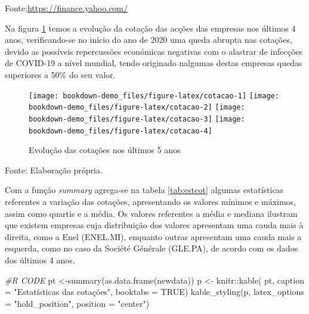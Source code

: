\documentclass[
  12pt,
  a4paper,
  openany]{book}
\newenvironment{Shaded}{\begin{snugshade}}{\end{snugshade}}
\newcommand{\AttributeTok}[1]{\textcolor[rgb]{0.77,0.63,0.00}{#1}}
\newcommand{\CommentTok}[1]{\textcolor[rgb]{0.56,0.35,0.01}{\textit{#1}}}
\newcommand{\ConstantTok}[1]{\textcolor[rgb]{0.00,0.00,0.00}{#1}}
\newcommand{\FunctionTok}[1]{\textcolor[rgb]{0.00,0.00,0.00}{#1}}
\newcommand{\NormalTok}[1]{#1}
\newcommand{\OtherTok}[1]{\textcolor[rgb]{0.56,0.35,0.01}{#1}}
\newcommand{\SpecialCharTok}[1]{\textcolor[rgb]{0.00,0.00,0.00}{#1}}
\newcommand{\StringTok}[1]{\textcolor[rgb]{0.31,0.60,0.02}{#1}}
\theoremstyle{definition}
\theoremstyle{definition}
\theoremstyle{definition}
\theoremstyle{remark}
\begin{document}
Fonte:\url{https://finance.yahoo.com/}

\justifying
\bigskip

Na figura \ref{fig:cotacao} temos a evolução da cotação das acções das empresas nos últimos 4 anos, verificando-se no inicio do ano de 2020 uma queda abrupta nas cotações, devido as possíveis repercussões económicas negativas com o alastrar de infecções de COVID-19 a nível mundial, tendo originado nalgumas destas empresas quedas superiores a 50\% do seu valor.

\begin{figure}

{\centering \texttt{[image: bookdown-demo\_files/figure-latex/cotacao-1]} \texttt{[image: bookdown-demo\_files/figure-latex/cotacao-2]} \texttt{[image: bookdown-demo\_files/figure-latex/cotacao-3]} \texttt{[image: bookdown-demo\_files/figure-latex/cotacao-4]} 

}

\caption{Evolução das cotações nos últimos 5 anos}\label{fig:cotacao}
\end{figure}
\FloatBarrier
\centering

Fonte: Elaboração própria.

\justifying
\bigskip

Com a função \emph{summary} agrega-se na tabela \ref{tab:estcot} algumas estatísticas referentes a variação das cotações, apresentando os valores mínimos e máximos, assim como quartis e a média. Os valores referentes a média e mediana ilustram que existem empresas cuja distribuição dos valores apresentam uma cauda mais à direita, como a Enel (ENEL.MI), enquanto outras apresentam uma cauda mais a esquerda, como no caso da Société Générale (GLE.PA), de acordo com os dados dos últimos 4 anos.

\scriptsize

\begin{Shaded}
\begin{Highlighting}[]
\CommentTok{\#R CODE}
\NormalTok{pt }\OtherTok{\textless{}{-}}\FunctionTok{summary}\NormalTok{(}\FunctionTok{as.data.frame}\NormalTok{(newdata))}
\NormalTok{p }\OtherTok{\textless{}{-}}\NormalTok{ knitr}\SpecialCharTok{::}\FunctionTok{kable}\NormalTok{(}
\NormalTok{  pt, }\AttributeTok{caption =} \StringTok{"Estatísticas das cotações"}\NormalTok{,}
  \AttributeTok{booktabs =} \ConstantTok{TRUE}\NormalTok{)}
\FunctionTok{kable\_styling}\NormalTok{(p, }\AttributeTok{latex\_options =} \StringTok{"hold\_position"}\NormalTok{, }\AttributeTok{position =} \StringTok{"center"}\NormalTok{)}
\end{Highlighting}
\end{Shaded}
\end{document}
